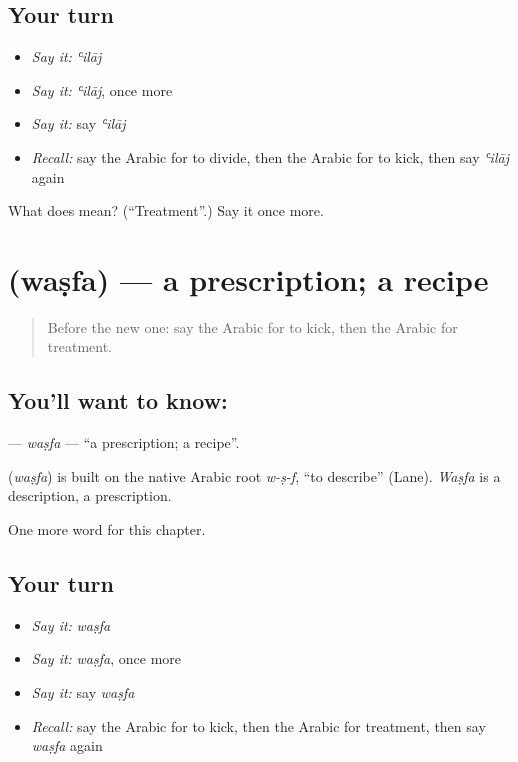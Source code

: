 \subsection*{Your turn}
\begin{itemize}
\raggedright
  \item \emph{Say it:} \emph{ʿilāj}
  \item \emph{Say it:} \emph{ʿilāj}, once more
  \item \emph{Say it:} say \emph{ʿilāj}
  \item \emph{Recall:} say the Arabic for to divide, then the Arabic for to kick, then say \emph{ʿilāj} again
\end{itemize}

\begin{tcolorbox}[breakable,colback=teal!4,colframe=teal!35!black,title={Before you move on}]
What does  mean? (\textquotedblleft{}Treatment\textquotedblright{}.) Say it once more.
\end{tcolorbox}
\section[\texorpdfstring{\ar{وصفة} (waṣfa)}{وصفة (waṣfa)}]{ (waṣfa) — a prescription; a recipe}

\label{lesson:AR-C231-wasfa}



\begin{quote}
Before the new one: say the Arabic for to kick, then the Arabic for treatment.
\end{quote}

\subsection*{You'll want to know: }
\textbf{} — \emph{waṣfa} — \textquotedblleft{}a prescription; a recipe\textquotedblright{}.

\begin{cousinweb}
\textbf{} (\emph{waṣfa}) is built on the native Arabic root \emph{w-ṣ-f}, \textquotedblleft{}to describe\textquotedblright{} (Lane). \emph{Waṣfa} is a description, a prescription.
\end{cousinweb}

\begin{grammarlens}[title={What you've built}]
One more word for this chapter.
\end{grammarlens}

\subsection*{Your turn}
\begin{itemize}
\raggedright
  \item \emph{Say it:} \emph{waṣfa}
  \item \emph{Say it:} \emph{waṣfa}, once more
  \item \emph{Say it:} say \emph{waṣfa}
  \item \emph{Recall:} say the Arabic for to kick, then the Arabic for treatment, then say \emph{waṣfa} again
\end{itemize}

